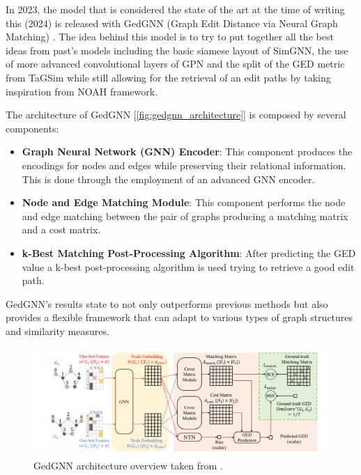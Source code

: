 \documentclass[../Thesis.tex]{subfiles}
\begin{document}
	In 2023, the model that is considered the state of the art at the time of writing this (2024) is released with GedGNN (Graph Edit Distance via Neural Graph Matching) \cite{computing_graph_edit_distance_via_neural_graph_matching}. The idea behind this model is to try to put together all the best ideas from past's models including the basic siamese layout of SimGNN, the use of more advanced convolutional layers of GPN and the split of the GED metric from TaGSim while still allowing for the retrieval of an edit paths by taking inspiration from NOAH framework.
	
	The architecture of GedGNN [\autoref{fig:gedgnn_architecture}] is composed by several components:
	
	\begin{itemize}
		\item \textbf{Graph Neural Network (GNN) Encoder}: This component produces the encodings for nodes and edges while preserving their relational information. This is done through the employment of an advanced GNN encoder.
		\item \textbf{Node and Edge Matching Module}: This component performs the node and edge matching between the pair of graphs producing a matching matrix and a cost matrix.
		\item \textbf{k-Best Matching Post-Processing Algorithm}: After predicting the GED value a k-best post-processing algorithm is used trying to retrieve a good edit path.
	\end{itemize}
	
	GedGNN's results state to not only outperforms previous methods but also provides a flexible framework that can adapt to various types of graph structures and similarity measures.
	
	\begin{figure}[H]
		\centering
		\includegraphics[width=\textwidth]{Images/gedgnn_architecture.png}
		\caption{GedGNN architecture overview taken from \cite{computing_graph_edit_distance_via_neural_graph_matching}.}
		\label{fig:gedgnn_architecture}
	\end{figure}
	
\end{document}
